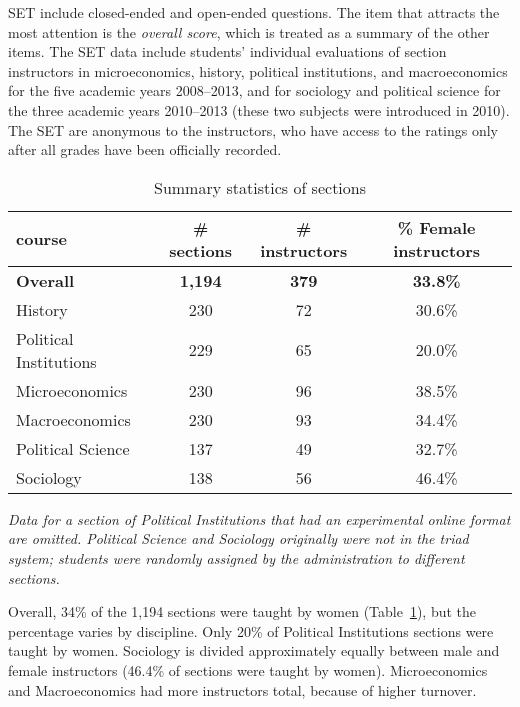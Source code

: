 \documentclass[12pt]{article}
\begin{document}
SET include closed-ended and open-ended questions.
The item that attracts the most attention is the \emph{overall score}, 
which is treated as a summary of the other items.
The SET data include students' individual evaluations of section
instructors in microeconomics, history, political institutions, and 
macroeconomics for the five academic years 2008--2013, and for 
sociology and political science for the three academic years 2010--2013 
(these two subjects were introduced in 2010). 
The SET are anonymous to the instructors, who have access to the ratings only after 
all grades have been officially recorded.  

\begin{table}[htbp]
  \centering
  \footnotesize 
  \caption{Summary statistics of sections}
    \begin{tabular}{lccc}
    \toprule 
    course     & \# sections & \# instructors  & \% Female instructors  \\
   \midrule
  \textbf{Overall} &  \textbf{1,194} & \textbf{379}  &\textbf{33.8\%} \\
    History    &               230 &      72          &   30.6\% \\
    Political Institutions  &  229 &      65          &   20.0\% \\    
    Microeconomics   &         230 &      96          &   38.5\% \\
    Macroeconomics   &         230 &      93          &   34.4\% \\
    Political Science &       137 &      49          &   32.7\% \\
    Sociology   &              138 &      56          &   46.4\%    \\
    \bottomrule
    \end{tabular}%
 \label{tab:description}%
 
\textit{Data for a section of Political Institutions that 
had an experimental online format are omitted.
Political Science and Sociology originally were not in the triad system; 
students were randomly assigned by the administration to different sections.
} 

\end{table}%
\normalsize
Overall, 34\% of the 1,194 sections were taught by women 
(Table~\ref{tab:description}), but the percentage varies by discipline. 
Only 20\% of Political Institutions sections were taught by women. 
Sociology is divided approximately equally between male and female instructors 
(46.4\% of sections were taught by women). 
Microeconomics and Macroeconomics had more instructors total, because of higher turnover.
\end{document}
